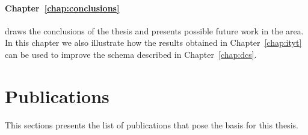 \medskip

\paragraph*{Chapter~\ref{chap:conclusions}} draws the conclusions of the thesis and presents possible future work in the area. In this chapter we also illustrate how the results obtained in Chapter~\ref{chap:ityt} can be used to improve the schema described in Chapter~\ref{chap:dcs}. 

\clearpage

\section{Publications}

This sections presents the list of publications that pose the basis for this thesis.

